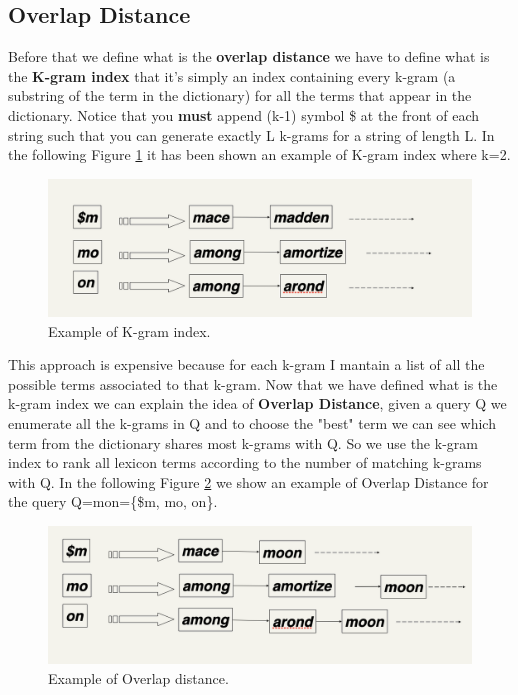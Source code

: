 \subsection{Overlap Distance}
Before that we define what is the \textbf{overlap distance} we have to define what is the \textbf{K-gram index} that it's simply an index containing every k-gram (a substring of the term in the dictionary) for all the terms that appear in the dictionary.\newline
Notice that you \textbf{must} append (k-1) symbol \$ at the front of each string such that you can generate exactly L k-grams for a string of length L.\newline
In the following Figure \ref{fig:kgramindex} it has been shown an example of K-gram index where k=2.
\begin{figure}
    \centering
    \includegraphics[width=0.75\linewidth]{images/kgramindex.png}
    \caption{Example of K-gram index.}
    \label{fig:kgramindex}
\end{figure}
This approach is expensive because for each k-gram I mantain a list of all the possible terms associated to that k-gram.\newline
Now that we have defined what is the k-gram index we can explain the idea of \textbf{Overlap Distance}, given a query Q we enumerate all the k-grams in Q and to choose the "best" term we can see which term from the dictionary shares most k-grams with Q. So we use the k-gram index to rank all lexicon terms according to the number of matching k-grams with Q.\newline
In the following Figure \ref{fig:overlapdistancexample} we show an example of Overlap Distance for the query Q=mon=\{\$m, mo, on\}.
\begin{figure}
    \centering
    \includegraphics[width=0.75\linewidth]{images/overlapdistanceexample.png}
    \caption{Example of Overlap distance.}
    \label{fig:overlapdistancexample}
\end{figure}
